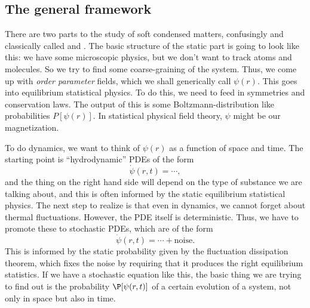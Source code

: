 \documentclass[a4paper]{article}
\begin{document}
\subsection{The general framework}
There are two parts to the study of soft condensed matters, confusingly and classically called  and . The basic structure of the static part is going to look like this: we have some microscopic physics, but we don't want to track atoms and molecules. So we try to find some coarse-graining of the system. Thus, we come up with \emph{order parameter} fields, which we shall generically call $\psi(r)$. This goes into equilibrium statistical physics. To do this, we need to feed in symmetries and conservation laws. The output of this is some Boltzmann-distribution like probabilities $P[\psi(r)]$. In statistical physical field theory, $\psi$ might be our magnetization.

To do dynamics, we want to think of $\psi(r)$ as a function of space and time. The starting point is ``hydrodynamic'' PDEs of the form
\[
  \dot{\psi}(r, t) = \cdots,
\]
and the thing on the right hand side will depend on the type of substance we are talking about, and this is often informed by the static equilibrium statistical physics. The next step to realize is that even in dynamics, we cannot forget about thermal fluctuations. However, the PDE itself is deterministic. Thus, we have to promote these to stochastic PDEs, which are of the form
\[
  \dot{\psi}(r, t) = \cdots + \text{noise}.
\]
This is informed by the static probability given by the fluctuation dissipation theorem, which fixes the noise by requiring that it produces the right equilibrium statistics. If we have a stochastic equation like this, the basic thing we are trying to find out is the probability $\P[\psi(r, t)]$ of a certain evolution of a system, not only in space but also in time.
\end{document}

